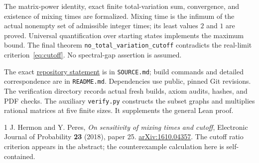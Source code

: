\documentclass[11pt]{article}
\begin{document}
The matrix-power identity, exact finite total-variation sum, convergence, and existence of mixing times are formalized. Mixing time is the infimum of the actual nonempty set of admissible integer times; its least values $2$ and $1$ are proved. Universal quantification over starting states implements the maximum bound. The final theorem \texttt{no\_total\_variation\_cutoff} contradicts the real-limit criterion~\eqref{eq:cutoff}. No spectral-gap assertion is assumed.

The exact \href{https://github.com/The-Last-Math-Competition/The-Last-Math-Competition/blob/main/conjectures/00000003961.md}{repository statement} is in \texttt{SOURCE.md}; build commands and detailed correspondence are in \texttt{README.md}. Dependencies use public, pinned Git revisions. The verification directory records actual fresh builds, axiom audits, hashes, and PDF checks. The auxiliary \texttt{verify.py} constructs the subset graphs and multiplies rational matrices at five finite sizes. It supplements the general Lean proof.

\begin{thebibliography}{1}
J. Hermon and Y. Peres, \emph{On sensitivity of mixing times and cutoff},
Electronic Journal of Probability \textbf{23} (2018), paper 25.
\href{https://arxiv.org/abs/1610.04357}{arXiv:1610.04357}.
The cutoff ratio criterion appears in the abstract; the counterexample calculation here is self-contained.
\end{thebibliography}
\end{document}
